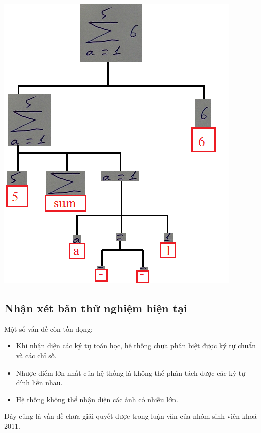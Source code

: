 \documentclass[a4paper,12pt]{article}
\begin{document}
	\newpage
	\begin{center}
		
		\centering
		\includegraphics[width=0.8\linewidth]{kq_2_1.png}
		\vspace{0.5cm}
	\end{center}
	\vspace{0.5cm}
	\subsection{Nhận xét bản thử nghiệm hiện tại}
	
	Một số vấn đề còn tồn đọng: 
	\begin{itemize}
		\item Khi nhận diện các ký tự toán học, hệ thống chưa phân biệt được ký tự chuẩn và các chỉ số.
		\item Nhược điểm lớn nhất của hệ thống là không thể phân tách được các ký tự dính liền nhau.
		\item Hệ thống không thể nhận diện các ảnh có nhiễu lớn.
	\end{itemize}
	
	Đây cũng là vấn đề chưa giải quyết được trong luận văn của nhóm sinh viên khoá 2011.
\end{document}
